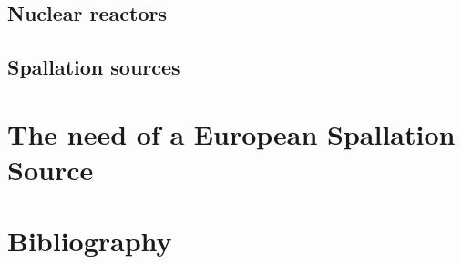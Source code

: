 \begin{refsection}
  \subsection{Nuclear reactors}
  \subsection{Spallation sources}

	\section{The need of a European Spallation Source}
	\label{ch1:Summary}

	\cleardoublepage
	\section{Bibliography}
  
	\printbibliography[heading=subbibliography]
\end{refsection}
